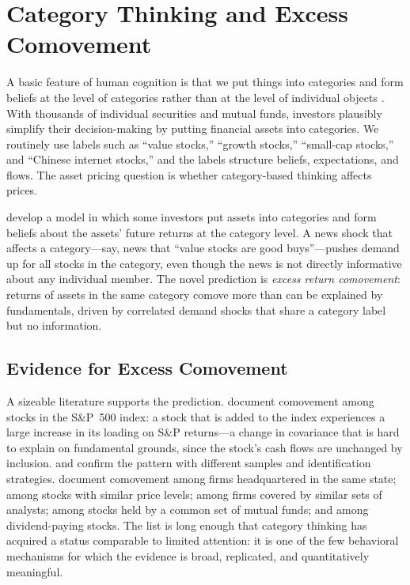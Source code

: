 \section{Category Thinking and Excess Comovement}
\label{sec:cat}

A basic feature of human cognition is that we put things into categories and form beliefs at the level of categories rather than at the level of individual objects \citep{rosch1978}. With thousands of individual securities and mutual funds, investors plausibly simplify their decision-making by putting financial assets into categories. We routinely use labels such as ``value stocks,'' ``growth stocks,'' ``small-cap stocks,'' and ``Chinese internet stocks,'' and the labels structure beliefs, expectations, and flows. The asset pricing question is whether category-based thinking affects prices.

\citet{barberisshleifer2003} develop a model in which some investors put assets into categories and form beliefs about the assets' future returns at the category level. A news shock that affects a category---say, news that ``value stocks are good buys''---pushes demand up for all stocks in the category, even though the news is not directly informative about any individual member. The novel prediction is \emph{excess return comovement}: returns of assets in the same category comove more than can be explained by fundamentals, driven by correlated demand shocks that share a category label but no information.

\subsection{Evidence for Excess Comovement}

A sizeable literature supports the prediction. \citet{barberiswurgler2005} document comovement among stocks in the S\&P~500 index: a stock that is added to the index experiences a large increase in its loading on S\&P returns---a change in covariance that is hard to explain on fundamental grounds, since the stock's cash flows are unchanged by inclusion. \citet{greenwood2008} and \citet{boyer2011} confirm the pattern with different samples and identification strategies. \citet{pirinsky2006} document comovement among firms headquartered in the same state; \citet{greenhwang2009} among stocks with similar price levels; \citet{israelsen2016} among firms covered by similar sets of analysts; \citet{antonpolk2014} among stocks held by a common set of mutual funds; and \citet{hameed2019} among dividend-paying stocks. The list is long enough that category thinking has acquired a status comparable to limited attention: it is one of the few behavioral mechanisms for which the evidence is broad, replicated, and quantitatively meaningful.

